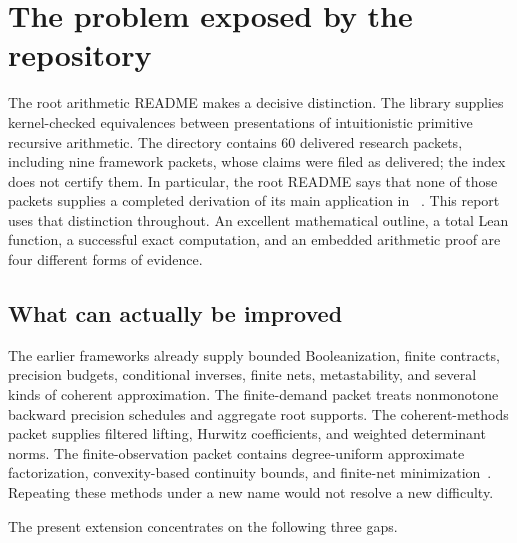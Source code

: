 \section{The problem exposed by the repository}
\label{sec:scope}

The root arithmetic README makes a decisive distinction. The
 library supplies kernel-checked equivalences between
presentations of intuitionistic primitive recursive arithmetic. The
 directory contains 60 delivered research packets,
including nine framework packets, whose claims were filed as delivered;
the index does not certify them. In particular, the root README says that
none of those packets supplies a completed derivation of its main
application in ~\cite{repo-root,repo-index}.
This report uses that distinction throughout. An excellent mathematical
outline, a total Lean function, a successful exact computation, and an
embedded arithmetic proof are four different forms of evidence.

\subsection{What can actually be improved}

The earlier frameworks already supply bounded Booleanization, finite
contracts, precision budgets, conditional inverses, finite nets,
metastability, and several kinds of coherent approximation.
The finite-demand packet treats nonmonotone backward precision schedules
and aggregate root supports. The coherent-methods packet supplies filtered
lifting, Hurwitz coefficients, and weighted determinant norms. The
finite-observation packet contains degree-uniform approximate
factorization, convexity-based continuity bounds, and finite-net
minimization~\cite{repo-demand,repo-coherent,repo-observation}.
Repeating these methods under a new name would not resolve a new difficulty.

The present extension concentrates on the following three gaps.

